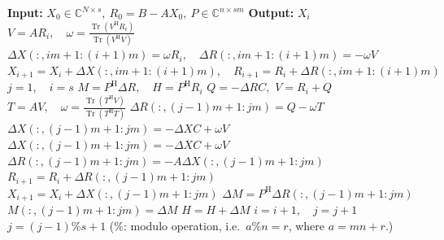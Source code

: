 \begin{algorithm}[H]\caption{{The block IDR($s$) method}}\label{alg:block-idr}\begin{algorithmic}[1]
\Statex\textbf{Input:} $X_0\in\mathbb C^{N\times s},\ R_0=B-AX_0,\ P\in\mathbb C^{n\times sm}$
\Statex\textbf{Output:} $X_i$
\State $V=AR_i,\quad\omega=\frac{\operatorname{Tr}(V^{\mathrm H}R_i)}{\operatorname{Tr}(V^{\mathrm H}V)}$
\State $\Delta X(:,im+1:(i+1)m)=\omega R_i,\quad\Delta R(:,im+1:(i+1)m)=-\omega V$
\State $X_{i+1}=X_i+\Delta X(:,im+1:(i+1)m),\quad R_{i+1}=R_i+\Delta R(:,im+1:(i+1)m)$
\EndFor
\State $j=1,\quad i=s$
\State $M=P^{\mathrm H}\Delta R,\quad H=P^{\mathrm H}R_i$
\State $Q=-\Delta RC,$
\State $V=R_i+Q$
\State $T=AV,\quad\omega=\frac{\operatorname{Tr}(T^{\mathrm H}V)}{\operatorname{Tr}(T^{\mathrm H}T)}$
\State $\Delta R(:,(j-1)m+1:jm)=Q-\omega T$
\State $\Delta X(:,(j-1)m+1:jm)=-\Delta XC+\omega V$
\Else
\State $\Delta X(:,(j-1)m+1:jm)=-\Delta XC+\omega V$
\State $\Delta R(:,(j-1)m+1:jm)=-A\Delta X(:,(j-1)m+1:jm)$
\EndIf
\State $R_{i+1}=R_i+\Delta R(:,(j-1)m+1:jm)$
\State $X_{i+1}=X_i+\Delta X(:,(j-1)m+1:jm)$
\State $\Delta M=P^{\mathrm H}\Delta R(:,(j-1)m+1:jm)$
\State $M(:,(j-1)m+1:jm)=\Delta M$
\State $H=H+\Delta M$
\State $i=i+1,\quad j=j+1$
\State $j=(j-1)\%s+1$ ({$\%$: modulo operation, i.e.\ $a\%n=r$, where $a=mn+r$.})
\EndFor\EndWhile\end{algorithmic}\end{algorithm}
